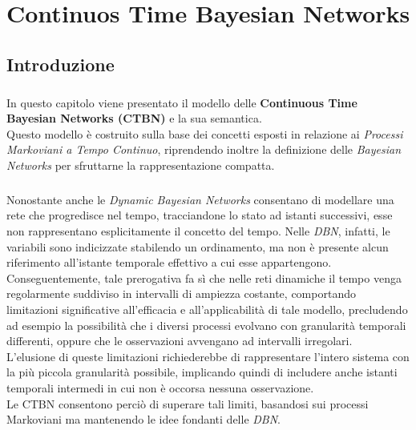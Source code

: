 \chapter{Continuos Time Bayesian Networks}
  \label{chapter_ctbn}
  \section{Introduzione}
  \paragraph{}
  In questo capitolo viene presentato il modello delle \textbf{Continuous Time Bayesian Networks (CTBN)} e la sua semantica.\\
  Questo modello è costruito sulla base dei concetti esposti in relazione ai \textit{Processi Markoviani a Tempo Continuo},
  riprendendo inoltre la definizione delle \textit{Bayesian Networks} per sfruttarne la rappresentazione compatta.
  
  \paragraph{}
  Nonostante anche le \textit{Dynamic Bayesian Networks} consentano di modellare una rete che progredisce
  nel tempo, tracciandone lo stato ad istanti successivi, esse non rappresentano esplicitamente il concetto del tempo. 
  Nelle \textit{DBN}, infatti, le variabili sono indicizzate stabilendo un ordinamento, ma non è presente alcun riferimento 
  all'istante temporale effettivo a cui esse appartengono. 
  Conseguentemente, tale prerogativa fa sì che nelle reti dinamiche il tempo venga regolarmente suddiviso in intervalli di ampiezza costante, 
  comportando limitazioni significative all'efficacia e all'applicabilità di tale modello, precludendo ad esempio la possibilità che i diversi processi 
  evolvano con granularità temporali differenti, oppure che le osservazioni avvengano ad intervalli irregolari.\\
  L'elusione di queste limitazioni richiederebbe di rappresentare l'intero sistema con la più piccola granularità
  possibile, implicando quindi di includere anche istanti temporali intermedi in cui non è occorsa nessuna
  osservazione.\\
  Le CTBN consentono perciò di superare tali limiti, basandosi sui processi Markoviani ma mantenendo
  le idee fondanti delle \textit{DBN}.


